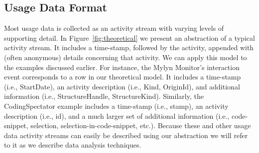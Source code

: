 \subsection{Usage Data Format}

Most usage data is collected as an activity stream with varying levels of supporting detail. In Figure~\ref{fig:theoretical} we present an abstraction of a typical activity stream. It includes a time-stamp, followed by the activity, appended with (often anonymous) details concerning that activity. We can apply this model to the examples discussed earlier. For instance, the Mylyn Monitor's interaction event corresponds to a row in our theoretical model. It includes a time-stamp (i.e., StartDate), an activity description (i.e., Kind, OriginId), and additional information (i.e., StructureHandle, StructureKind). Similarly, the CodingSpectator example includes a time-stamp (i.e., stamp), an activity description (i.e., id), and a much larger set of additional information (i.e., code-snippet, selection, selection-in-code-snippet, etc.). Because these and other usage data activity streams can easily be described using our abstraction we will refer to it as we describe data analysis techniques.









